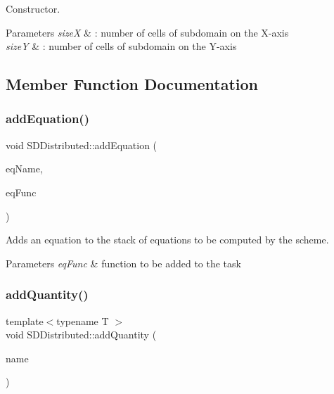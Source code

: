Constructor. 


\begin{DoxyParams}{Parameters}
{\em sizeX} & \+: number of cells of subdomain on the X-\/axis \\
\hline
{\em sizeY} & \+: number of cells of subdomain on the Y-\/axis \\
\hline
\end{DoxyParams}


\subsection{Member Function Documentation}
\mbox{\label{classSDDistributed_a0974e2cce9bfcddfd0acccd1105d980f}} 
\subsubsection{\texorpdfstring{add\+Equation()}{addEquation()}}
{\footnotesize\ttfamily void S\+D\+Distributed\+::add\+Equation (\begin{DoxyParamCaption}\item[{std\+::string}]{eq\+Name,  }\item[{eq\+Type}]{eq\+Func }\end{DoxyParamCaption})}



Adds an equation to the stack of equations to be computed by the scheme. 


\begin{DoxyParams}{Parameters}
{\em eq\+Func} & function to be added to the task \\
\hline
\end{DoxyParams}
\mbox{\label{classSDDistributed_a82b5a390e964051d1952c683b4fa5f05}} 
\subsubsection{\texorpdfstring{add\+Quantity()}{addQuantity()}\hspace{0.1cm}{\footnotesize\ttfamily [1/2]}}
{\footnotesize\ttfamily template$<$typename T $>$ \\
void S\+D\+Distributed\+::add\+Quantity (\begin{DoxyParamCaption}\item[{std\+::string}]{name }\end{DoxyParamCaption})}




